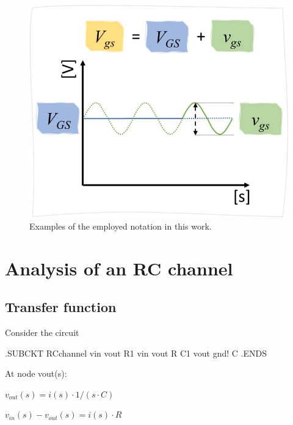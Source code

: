 \documentclass{article}
\begin{document}
\begin{figure}[!b]
	\centering
	\includegraphics[scale=0.5]{./imgs/NOTATIONR00.jpg}
	\caption{Examples of the employed notation in this work.}
	\label{fig:NOTATIONR00}
\end{figure}

\section{Analysis of an RC channel} %

\subsection{Transfer function}

Consider the circuit

\begin{file}
	
.SUBCKT RCchannel vin vout 	\newline
R1 vin vout R				\newline
C1 vout gnd! C				\newline
.ENDS
\end{file}

At node vout(s):

\centerline{$ v_{out}(s) = i(s) \cdot 1/(s \cdot C)
	$}
\vspace{\baselineskip}

\centerline{$ v_{in}(s) - v_{out}(s) = i(s) \cdot R
	$}
\vspace{\baselineskip}
\end{document}
